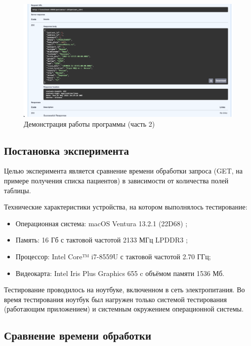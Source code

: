 \begin{figure}[h]
	\centering
	\captionsetup{justification=centering}
	\includegraphics[width=140mm]{img/example-2.png}
	\caption{Демонстрация  работы  программы  (часть 2)}
	\label{fig:example-2}
\end{figure}

\subsection{Постановка эксперимента}

Целью эксперимента является сравнение времени обработки запроса (GET, на примере получения списка пациентов) в зависимости от количества полей таблицы.

Технические характеристики устройства, на котором выполнялось тестирование:

\begin{itemize}[label=---]
	\item Операционная система: macOS Ventura 13.2.1 (22D68)  \cite{macos};
	\item Память: 16 Гб с тактовой частотой 2133 МГц LPDDR3 \cite{memory};
	\item Процессор: Intel Core™ i7-8559U \cite{intel} с тактовой частотой  2.70 ГГц;
	\item Видеокарта: Intel Iris Plus Graphics 655 \cite{graphics} c объёмом памяти 1536 Мб.
\end{itemize}

Тестирование проводилось на ноутбуке, включенном в сеть электропитания. Во время тестирования ноутбук был нагружен только системой тестирования (работающим приложением) и системным окружением операционной системы.

\subsection{Сравнение времени обработки}

